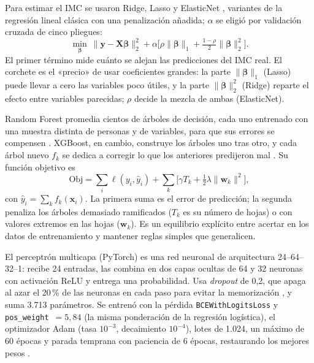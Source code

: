 \documentclass[conference,a4paper]{IEEEtran}
\begin{document}
Para estimar el IMC se usaron Ridge, Lasso y ElasticNet \citep{hoerl1970,tibshirani1996,zou2005}, variantes de la regresión lineal clásica con una penalización añadida; $\alpha$ se eligió por validación cruzada de cinco pliegues:
\begin{equation}
\min_{\boldsymbol\beta}\ \lVert\mathbf y-\mathbf X\boldsymbol\beta\rVert_2^2+\alpha\Big[\rho\lVert\boldsymbol\beta\rVert_1+\tfrac{1-\rho}{2}\lVert\boldsymbol\beta\rVert_2^2\Big].
\end{equation}
El primer término mide cuánto se alejan las predicciones del IMC real. El corchete es el «precio» de usar coeficientes grandes: la parte $\lVert\boldsymbol\beta\rVert_1$ (Lasso) puede llevar a cero las variables poco útiles, y la parte $\lVert\boldsymbol\beta\rVert_2^2$ (Ridge) reparte el efecto entre variables parecidas; $\rho$ decide la mezcla de ambas (ElasticNet).

Random Forest promedia cientos de árboles de decisión, cada uno entrenado con una muestra distinta de personas y de variables, para que sus errores se compensen \citep{breiman2001}. XGBoost, en cambio, construye los árboles uno tras otro, y cada árbol nuevo $f_k$ se dedica a corregir lo que los anteriores predijeron mal \citep{chen2016}. Su función objetivo es
\begin{equation}
\text{Obj}=\sum_i \ell(y_i,\hat y_i)+\sum_k\Big[\gamma T_k+\tfrac12\lambda\lVert\mathbf w_k\rVert^2\Big],
\end{equation}
con $\hat y_i=\sum_k f_k(\mathbf x_i)$. La primera suma es el error de predicción; la segunda penaliza los árboles demasiado ramificados ($T_k$ es su número de hojas) o con valores extremos en las hojas ($\mathbf w_k$). Es un equilibrio explícito entre acertar en los datos de entrenamiento y mantener reglas simples que generalicen.

El perceptrón multicapa (PyTorch) es una red neuronal de arquitectura 24--64--32--1: recibe 24 entradas, las combina en dos capas ocultas de 64 y 32 neuronas con activación ReLU y entrega una probabilidad. Usa \textit{dropout} de 0,2, que apaga al azar el 20\,\% de las neuronas en cada paso para evitar la memorización \citep{srivastava2014}, y suma 3.713 parámetros. Se entrenó con la pérdida \texttt{BCEWithLogitsLoss} y \texttt{pos\_weight}~$=5{,}84$ (la misma ponderación de la regresión logística), el optimizador Adam \citep{kingma2015} (tasa $10^{-3}$, decaimiento $10^{-4}$), lotes de 1.024, un máximo de 60 épocas y parada temprana con paciencia de 6 épocas, restaurando los mejores pesos \citep{prechelt1998}.
\end{document}
